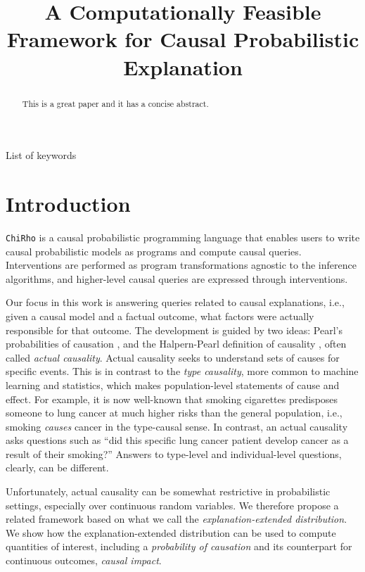 \documentclass[anon,12pt]{clear2025} %
\title[Explainable]{A Computationally Feasible Framework for  Causal Probabilistic Explanation}
\renewcommand{\texttt}[1]{\lstinline[basicstyle=\fontsize{8pt}{8.25pt}\selectfont\ttfamily]{#1}}
\begin{document}
\maketitle

\begin{abstract}%
  This is a great paper and it has a concise abstract.%
\end{abstract}

\begin{keywords}%
  List of keywords%
\end{keywords}


\section{Introduction}

\texttt{ChiRho} is a causal probabilistic programming language that enables users to write causal probabilistic models as programs and compute causal queries. Interventions are performed as program transformations agnostic to the inference algorithms, and higher-level causal queries are expressed through interventions. 

Our focus in this work is answering queries related to causal explanations, i.e., given a causal model and a factual outcome, what factors were actually responsible for that outcome. The development is guided by two ideas: Pearl's probabilities of causation \cite{pearl2022probabilities}, and the Halpern-Pearl definition of causality \cite{actualCausalityHalpern}, often called \emph{actual causality}. Actual causality seeks to understand sets of causes for specific events. This is in contrast to the \emph{type causality}, more common to machine learning and statistics, which makes population-level statements of cause and effect. For example, it is now well-known that smoking cigarettes predisposes someone to lung cancer at much higher risks than the general population, i.e., smoking \emph{causes} cancer in the type-causal sense. In contrast, an actual causality asks questions such as ``did this specific lung cancer patient develop cancer as a result of their smoking?'' Answers to type-level and individual-level questions, clearly, can be different.

Unfortunately, actual causality can be somewhat restrictive in probabilistic settings, especially over continuous random variables. We therefore propose a related framework based on what we call the \emph{explanation-extended distribution}. We show how the explanation-extended distribution can be used to compute quantities of interest, including a \emph{probability of causation} and its counterpart for continuous outcomes, \emph{causal impact}. 
\end{document}
